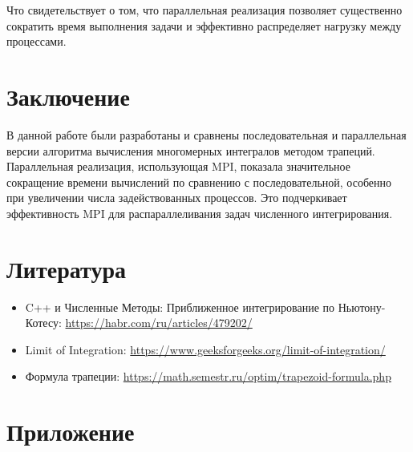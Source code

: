 \documentclass{article}
\begin{document}
Что свидетельствует о том, что параллельная реализация позволяет существенно сократить время выполнения задачи и эффективно распределяет нагрузку между процессами.

 \vspace{1.0cm}
 
\section{Заключение}

\hspace{0.5cm}В данной работе были разработаны и сравнены последовательная и параллельная версии алгоритма вычисления многомерных интегралов методом трапеций. Параллельная реализация, использующая MPI, показала значительное сокращение времени вычислений по сравнению с последовательной, особенно при увеличении числа задействованных процессов. Это подчеркивает эффективность MPI для распараллеливания задач численного интегрирования.

 \vspace{1cm}

 \section{Литература}
\begin{itemize}
    \item C++ и Численные Методы: Приближенное интегрирование по Ньютону-Котесу: \url{https://habr.com/ru/articles/479202/}
    \item Limit of Integration: \url{https://www.geeksforgeeks.org/limit-of-integration/}
    \item Формула трапеции: \url{https://math.semestr.ru/optim/trapezoid-formula.php}
\end{itemize}

\vspace{1cm}


\section{Приложение}
\end{document}
